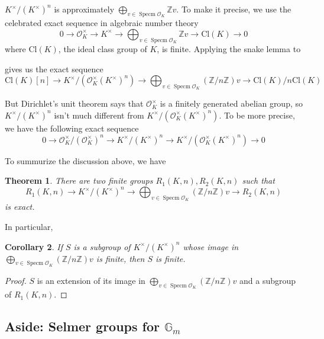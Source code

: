 \documentclass{article}
\newtheorem{thm}{Theorem}
\newtheorem{cor}[thm]{Corollary}
\newcommand{\ord}{\mathcal{O}}
\newcommand{\kmkn}{K ^{\times} / (K ^{\times})^{n}}
\DeclareMathOperator{\spec}{Specm}
\begin{document}
$ \kmkn $ is approximately $ \bigoplus _{v\in\spec \ord _{K}} \mathbb{Z}v $.
To make it precise, we use the celebrated exact sequence in algebraic number theory
$$ 0\to \ord _{K}^{\times} \to K ^{\times}\to \bigoplus _{v\in \spec \ord _{K}} \mathbb{Z}v 
\to \mathrm{Cl}(K)\to 0$$
where $ \mathrm{Cl}(K) $, the ideal class group of $ K $, is finite.
Applying the snake lemma to
\begin{figure}[H]
\centering
{}
\end{figure}
gives us the exact sequence
$$ \mathrm{Cl}(K)[n] \to K ^{\times}/(\ord _{K}^{\times} (K ^{\times})^{n})\to
\bigoplus _{v\in \spec \ord _{K}} (\mathbb{Z}/n \mathbb{Z}) v \to
\mathrm{Cl}(K)/n \mathrm{Cl}(K)$$

But Dirichlet's unit theorem says that
$ \ord _{K}^{\times} $ is a finitely generated abelian group,
so $ \kmkn $ isn't much different from $ K ^{\times}/(\ord _{K}^{\times} (K ^{\times})^{n}) $.
To be more precise, we have the following exact sequence
$$ 0\to \ord _{K}^{\times}/ (\ord _{K}^{\times})^{n} \to
\kmkn \to K ^{\times}/(\ord _{K}^{\times} (K ^{\times})^{n})\to 0$$

To summurize the discussion above, we have
\begin{thm}
There are two finite groups $ R _{1}(K, n), R _{2}(K, n) $ such that
$$ R _{1}(K, n)\to \kmkn \to  
\bigoplus _{v\in \spec \ord _{K}} (\mathbb{Z}/n \mathbb{Z}) v \to R _{2}(K, n) $$
is exact.\label{comparison:h1}
\end{thm}
In particular,
\begin{cor}
If $ S $ is a subgroup of $ \kmkn $ whose image in
$ \bigoplus _{v\in \spec \ord _{K}} (\mathbb{Z}/n \mathbb{Z}) v$ is finite,
then $ S $ is finite. \label{subgrp:finite}
\end{cor}

\begin{proof}
$ S $ is an extension of its image in
$ \bigoplus _{v\in \spec \ord _{K}} (\mathbb{Z}/n \mathbb{Z}) v$ and a subgroup of
$ R _{1}(K, n) $.
\end{proof}

\subsection{Aside: Selmer groups for $ \mathbb{G}_{m} $}
\end{document}
